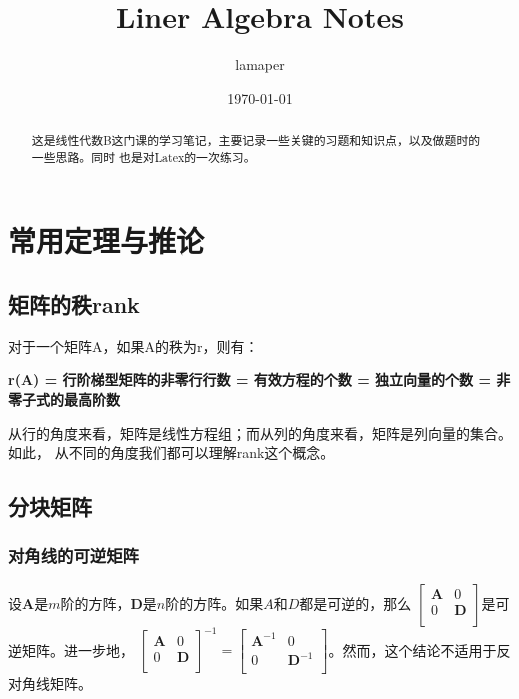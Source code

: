 \documentclass{ctexart}
\title{Liner Algebra Notes}
\author{lamaper}
\date{\today}
\begin{document}
    \maketitle

    \begin{abstract}
        这是线性代数B这门课的学习笔记，主要记录一些关键的习题和知识点，以及做题时的一些思路。同时
        也是对Latex的一次练习。
    \end{abstract}

    \section{常用定理与推论}
        \subsection{矩阵的秩rank}
        对于一个矩阵A，如果A的秩为r，则有：
        
        \textbf{\fangsong r(A) = 行阶梯型矩阵的非零行行数 = 有效方程的个数 = 独立向量的个数 = 非零子式的最高阶数}
        
        从行的角度来看，矩阵是线性方程组；而从列的角度来看，矩阵是列向量的集合。如此，
        从不同的角度我们都可以理解rank这个概念。
        \subsection{分块矩阵}
            \subsubsection{对角线的可逆矩阵}
            设$\mathbf{A}$是$m$阶的方阵，$\mathbf{D}$是$n$阶的方阵。如果$A$和$D$都是可逆的，那么
            $\begin{bmatrix}
                \mathbf{A} & 0 \\
                0 & \mathbf{D} \\
            \end{bmatrix}$是可逆矩阵。进一步地，
            $
            \begin{bmatrix}
                \mathbf{A} & 0 \\
                0 & \mathbf{D} \\
            \end{bmatrix}^{-1} = \begin{bmatrix}
                \mathbf{A}^{-1} & 0 \\
                0 & \mathbf{D}^{-1} \\
            \end{bmatrix}
            $。然而，这个结论不适用于反对角线矩阵。
\end{document}
